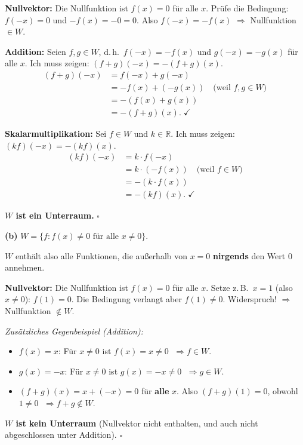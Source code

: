\documentclass[a4paper,12pt]{article}
\begin{document}
\textbf{Nullvektor:}
Die Nullfunktion ist $f(x) = 0$ f\"ur alle $x$.
Pr\"ufe die Bedingung: $f(-x) = 0$ und $-f(x) = -0 = 0$.
Also $f(-x) = -f(x)$ \;\checkmark \quad $\Rightarrow$ Nullfunktion $\in W$.

\textbf{Addition:}
Seien $f, g \in W$, d.\,h.\ $f(-x) = -f(x)$ und $g(-x) = -g(x)$
f\"ur alle $x$.
Ich muss zeigen: $(f+g)(-x) = -(f+g)(x)$.
\begin{align*}
(f+g)(-x) &= f(-x) + g(-x) \\
           &= -f(x) + (-g(x)) \quad \text{(weil } f,g \in W\text{)} \\
           &= -(f(x) + g(x)) \\
           &= -(f+g)(x). \;\checkmark
\end{align*}

\textbf{Skalarmultiplikation:}
Sei $f \in W$ und $k \in \mathbb{R}$.
Ich muss zeigen: $(kf)(-x) = -(kf)(x)$.
\begin{align*}
(kf)(-x) &= k \cdot f(-x) \\
         &= k \cdot (-f(x)) \quad \text{(weil } f \in W\text{)} \\
         &= -(k \cdot f(x)) \\
         &= -(kf)(x). \;\checkmark
\end{align*}

\textbf{$W$ ist ein Unterraum.} $\square$

\bigskip

\textbf{(b)} $W = \{f : f(x) \neq 0 \text{ f\"ur alle } x \neq 0\}$.

$W$ enth\"alt also alle Funktionen, die au\ss erhalb von $x = 0$
\textbf{nirgends} den Wert $0$ annehmen.

\textbf{Nullvektor:}
Die Nullfunktion ist $f(x) = 0$ f\"ur alle $x$.
Setze z.\,B.\ $x = 1$ (also $x \neq 0$): $f(1) = 0$.
Die Bedingung verlangt aber $f(1) \neq 0$. Widerspruch!
$\Rightarrow$ Nullfunktion $\notin W$.

\textit{Zus\"atzliches Gegenbeispiel (Addition):}
\begin{itemize}[nosep]
\item $f(x) = x$: F\"ur $x \neq 0$ ist $f(x) = x \neq 0$ \;\checkmark
      $\;\Rightarrow f \in W$.
\item $g(x) = -x$: F\"ur $x \neq 0$ ist $g(x) = -x \neq 0$ \;\checkmark
      $\;\Rightarrow g \in W$.
\item $(f+g)(x) = x + (-x) = 0$ f\"ur \textbf{alle} $x$.
      Also $(f+g)(1) = 0$, obwohl $1 \neq 0$
      $\;\Rightarrow f+g \notin W$.
\end{itemize}

\textbf{$W$ ist kein Unterraum} (Nullvektor nicht enthalten,
und auch nicht abgeschlossen unter Addition). $\square$
\end{document}
